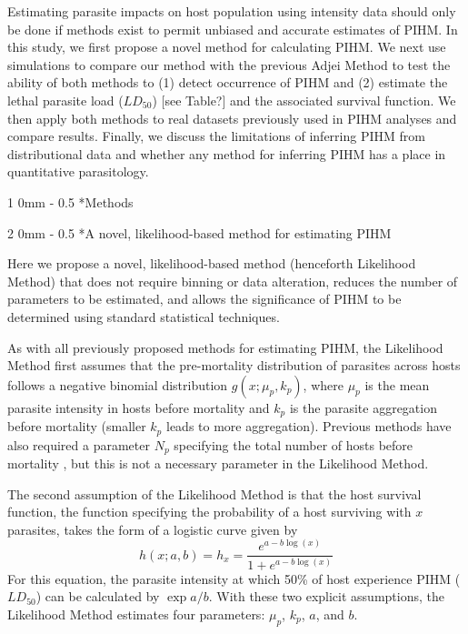 \documentclass[12pt, a4paper]{article}
\makeatletter
\renewcommand{\section}{\@startsection
{section}%
{1}%
{0mm}%
{-\baselineskip}%
{0.5\baselineskip}%
{\normalfont\bf\large}} %
\renewcommand{\subsection}{\@startsection
{subsection}%
{2}%
{0mm}%
{-\baselineskip}%
{0.5\baselineskip}%
{\normalfont\bf}} %
\makeatother
\begin{document}
Estimating parasite impacts on host population using intensity data should only
be done if methods exist to permit unbiased and accurate estimates of PIHM. In
this study, we first propose a novel method for calculating PIHM. We
next use simulations to compare our method with the previous Adjei
Method to test the ability of both methods to (1) detect occurrence of PIHM and (2) estimate the
lethal parasite load ($LD_{50}$) [see Table?] and the associated survival function.  We then
apply both methods to real datasets previously used in PIHM analyses and
compare results. Finally, we discuss the limitations of inferring PIHM
from distributional data and whether any method for inferring PIHM has a place
in quantitative parasitology.

\section*{Methods}

\subsection*{A novel, likelihood-based method for estimating PIHM}

Here we propose a novel, likelihood-based method (henceforth Likelihood Method) that does not
require binning or data alteration, reduces the number of
parameters to be estimated, and allows the significance of PIHM to be determined
using standard statistical techniques.

As with all previously proposed methods for estimating PIHM, the
Likelihood Method first assumes that the pre-mortality distribution of parasites across hosts follows a
negative binomial distribution $g(x; \mu_p, k_p)$, where $\mu_p$ is the mean parasite intensity in hosts before mortality and $k_p$ is the parasite aggregation before mortality (smaller $k_p$ leads to more aggregation).   Previous methods have also required a parameter $N_p$ specifying the total number of hosts before mortality \citep{Crofton1971a,Adjei1986}, but this is not a necessary parameter in the Likelihood Method.

The second assumption of the Likelihood Method is that the host survival function, the function specifying the probability of a host surviving with $x$ parasites, takes the form of a logistic curve given by
\begin{equation}
    h(x ; a, b) = h_x = \dfrac{e^{a - b \log(x)}}{1 + e^{a - b \log(x)}}
    \label{eq:logistic}
\end{equation}
For this equation, the parasite intensity at which 50\% of host experience PIHM ($LD_{50}$) can be calculated by $\exp{a / b}$. With these two explicit assumptions, the Likelihood Method estimates four parameters: $\mu_p$, $k_p$, $a$, and $b$.
\end{document}
